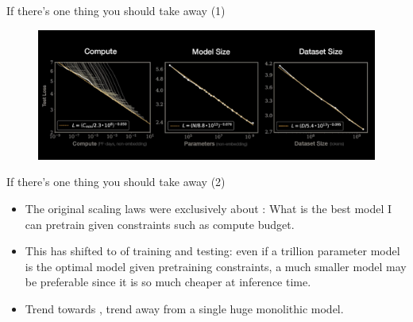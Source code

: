 \begin{vbframe}{If there's one thing you should take away (1)}

\vfill

\begin{figure}
	\centering
	\includegraphics[width = 12cm]{./figure/3thingserrorratescaleswith.png} \\ 
\end{figure}

\vfill

\end{vbframe}

\begin{vbframe}{If there's one thing you should take away (2)}


\vfill

\begin{itemize}
	\item The original scaling laws were exclusively
        about : What is the best model
        I can pretrain given
        constraints such as compute budget.

\item This has shifted to  of training
        and testing: even if a trillion parameter model is the optimal
        model given pretraining constraints, a much smaller
        model may be preferable since it is so much cheaper at
        inference time.

\item Trend towards , trend away
        from a single huge monolithic model.

\end{itemize}

\vfill

\end{vbframe}


